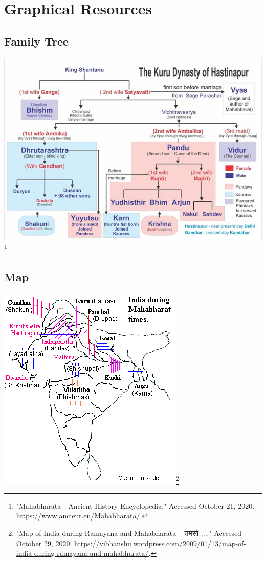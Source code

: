 \documentclass[10pt, letterpaper]{article}
\begin{document}
\newpage
\section{Graphical Resources}
\subsection{Family Tree}
\begin{center}
    \includegraphics[scale = 0.75]{image3.png}\footnote{"Mahabharata
  - Ancient History Encyclopedia." Accessed October 21, 2020.
  \href{https://www.ancient.eu/Mahabharata/}{\underline{https://www.ancient.eu/Mahabharata/}}.}

\end{center}

\subsection{Map}
\begin{center}
\includegraphics[scale = 1]{image1.png}\footnote{"Map
  of India during Ramayana and Mahabharata -- तमसो ...." Accessed
  October 29, 2020.
  \href{https://vibhanshu.wordpress.com/2009/01/13/map-of-india-during-ramayana-and-mahabharata/}{\underline{https://vibhanshu.wordpress.com/2009/01/13/map-of-india-during-ramayana-and-mahabharata/}}.}
\end{center}
\end{document}
